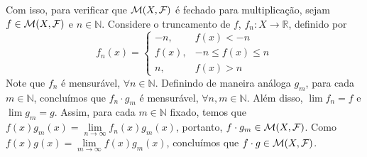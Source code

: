 \bigline
Com isso, para verificar que $\mathcal{M}(X,\mathcal{F})$ é fechado para multiplicação, 
sejam $f \in \mathcal{M}(X,\mathcal{F})$ e $n \in \mathbb{N}$. Considere o truncamento de $f$, $f_n: X \rightarrow \mathbb{R}$, definido por %
$$ f_n(x) = \begin{cases} 
-n, & f(x) < -n \\ 
f(x), & -n \le f(x) \le n \\ 
n, & f(x) > n 
\end{cases} $$ %
Note que $f_n$ é mensurável, $\forall n \in \mathbb{N}$. Definindo de maneira análoga $g_m$, para cada $m \in \mathbb{N}$, %
concluímos que $f_n \cdot g_m$ é mensurável, $\forall n, m \in \mathbb{N}$. Além disso, $\lim f_n = f$ e $\lim g_m = g$. %
Assim, para cada $m \in \mathbb{N}$ fixado, temos que $f(x)g_m(x) = \lim\limits_{n \rightarrow \infty} f_n(x)g_m(x)$, portanto, $f \cdot g_m \in \mathcal{M}(X,\mathcal{F})$. %
Como $f(x)g(x) = \lim\limits_{m \rightarrow \infty} f(x)g_m(x)$, concluímos que $f \cdot g \in \mathcal{M}(X,\mathcal{F})$. %


